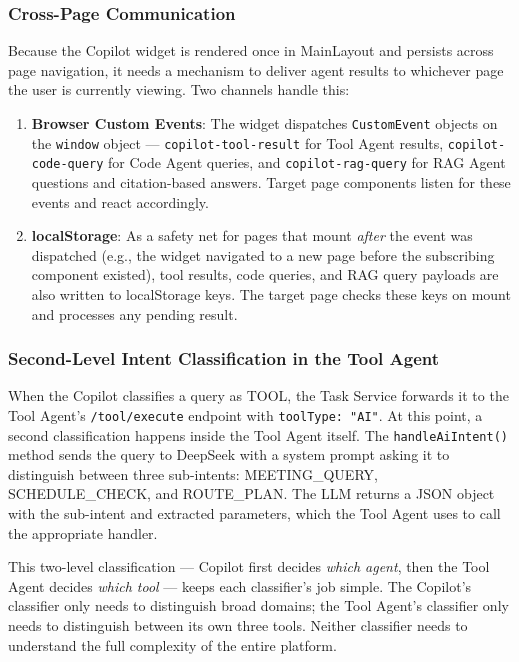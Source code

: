 \subsubsection{Cross-Page Communication}

Because the Copilot widget is rendered once in MainLayout and persists across page navigation, it needs a mechanism to deliver agent results to whichever page the user is currently viewing. Two channels handle this:

\begin{enumerate}
  \item \textbf{Browser Custom Events}: The widget dispatches \texttt{CustomEvent} objects on the \texttt{window} object --- \texttt{copilot-tool-result} for Tool Agent results, \texttt{copilot-code-query} for Code Agent queries, and \texttt{copilot-rag-query} for RAG Agent questions and citation-based answers. Target page components listen for these events and react accordingly.
  \item \textbf{localStorage}: As a safety net for pages that mount \textit{after} the event was dispatched (e.g., the widget navigated to a new page before the subscribing component existed), tool results, code queries, and RAG query payloads are also written to localStorage keys. The target page checks these keys on mount and processes any pending result.
\end{enumerate}

\subsubsection{Second-Level Intent Classification in the Tool Agent}

When the Copilot classifies a query as TOOL, the Task Service forwards it to the Tool Agent's \texttt{/tool/execute} endpoint with \texttt{toolType: "AI"}. At this point, a second classification happens inside the Tool Agent itself. The \texttt{handleAiIntent()} method sends the query to DeepSeek with a system prompt asking it to distinguish between three sub-intents: MEETING\_QUERY, SCHEDULE\_CHECK, and ROUTE\_PLAN. The LLM returns a JSON object with the sub-intent and extracted parameters, which the Tool Agent uses to call the appropriate handler.

This two-level classification --- Copilot first decides \textit{which agent}, then the Tool Agent decides \textit{which tool} --- keeps each classifier's job simple. The Copilot's classifier only needs to distinguish broad domains; the Tool Agent's classifier only needs to distinguish between its own three tools. Neither classifier needs to understand the full complexity of the entire platform.

